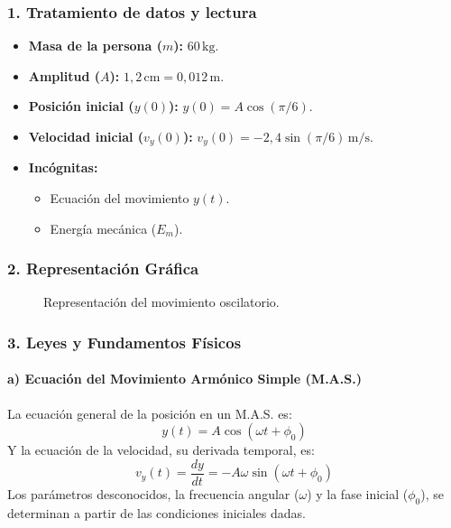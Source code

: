 \subsubsection*{1. Tratamiento de datos y lectura}
\begin{itemize}
    \item \textbf{Masa de la persona ($m$):} $60\,\text{kg}$.
    \item \textbf{Amplitud ($A$):} $1,2\,\text{cm} = 0,012\,\text{m}$.
    \item \textbf{Posición inicial ($y(0)$):} $y(0) = A\cos(\pi/6)$.
    \item \textbf{Velocidad inicial ($v_y(0)$):} $v_y(0) = -2,4\sin(\pi/6)\,\text{m/s}$.
    \item \textbf{Incógnitas:}
    \begin{itemize}
        \item Ecuación del movimiento $y(t)$.
        \item Energía mecánica ($E_m$).
    \end{itemize}
\end{itemize}

\subsubsection*{2. Representación Gráfica}
\begin{figure}[H]
    \centering
    \caption{Representación del movimiento oscilatorio.}
\end{figure}

\subsubsection*{3. Leyes y Fundamentos Físicos}
\paragraph*{a) Ecuación del Movimiento Armónico Simple (M.A.S.)}
La ecuación general de la posición en un M.A.S. es:
$$ y(t) = A \cos(\omega t + \phi_0) $$
Y la ecuación de la velocidad, su derivada temporal, es:
$$ v_y(t) = \frac{dy}{dt} = -A\omega \sin(\omega t + \phi_0) $$
Los parámetros desconocidos, la frecuencia angular ($\omega$) y la fase inicial ($\phi_0$), se determinan a partir de las condiciones iniciales dadas.

